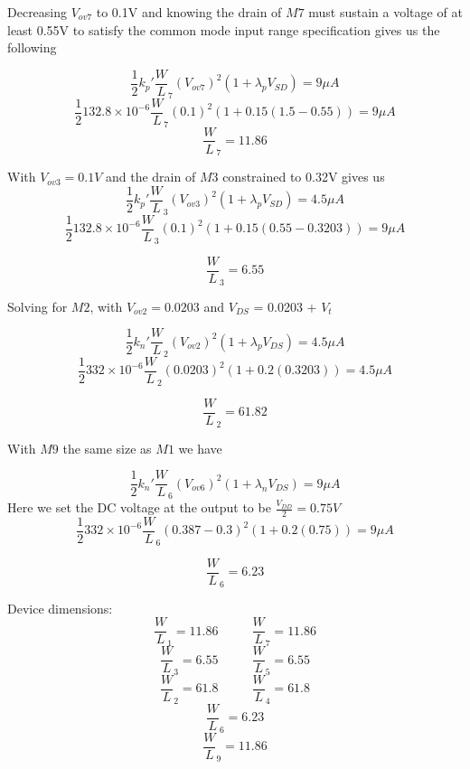 \documentclass[]{article}
\begin{document}
\begin{enumerate}
		Decreasing $V_{ov7}$ to 0.1V and knowing the drain of $M7$ must sustain a voltage of at least 0.55V to satisfy the common mode input range specification gives us the following

		$$ \frac{1}{2}k_{p}'\frac{W}{L}_{7}(V_{ov7})^2(1+\lambda_{p}V_{SD}) = 9\mu A $$
		$$ \frac{1}{2}132.8\times10^{-6}\frac{W}{L}_{7}(0.1)^2(1+0.15(1.5-0.55)) = 9\mu A $$
		$$ \frac{W}{L}_{7} = 11.86$$
		\newline

		With $V_{ov3} = 0.1V $ and the drain of $M3$ constrained to 0.32V gives us
		$$ \frac{1}{2}k_{p}'\frac{W}{L}_{3}(V_{ov3})^2(1+\lambda_{p}V_{SD}) = 4.5\mu A $$
		$$ \frac{1}{2}132.8\times10^{-6}\frac{W}{L}_{3}(0.1)^2(1+0.15(0.55-0.3203)) = 9\mu A $$

		$$ \frac{W}{L}_{3} = 6.55$$
		\newline

		Solving for $M2$, with $V_{ov2} = 0.0203 $ and $V_{DS}$ = 0.0203 + $V_{t}$

		$$ \frac{1}{2}k_{n}'\frac{W}{L}_{2}(V_{ov2})^2(1+\lambda_{p}V_{DS}) = 4.5\mu A $$
		$$ \frac{1}{2}332\times10^{-6}\frac{W}{L}_{2}(0.0203)^2(1+0.2(0.3203)) = 4.5\mu A $$

		$$ \frac{W}{L}_{2} = 61.82$$
		\newline

		With $M9$ the same size as $M1$ we have

		$$ \frac{1}{2}k_{n}'\frac{W}{L}_{6}(V_{ov6})^2(1+\lambda_{n}V_{DS}) = 9\mu A $$
		Here we set the DC voltage at the output to be $\frac{V_{DD}}{2} = 0.75V$
		$$ \frac{1}{2}332\times10^{-6}\frac{W}{L}_{6}(0.387-0.3)^2(1+0.2(0.75)) = 9\mu A $$

		$$ \frac{W}{L}_{6} = 6.23$$

		Device dimensions:
		$$ \frac{W}{L}_{1} = 11.86 \ \ \ \ \ \ \ \ \ \ \ \ \frac{W}{L}_{7} = 11.86$$
		$$ \frac{W}{L}_{3} = 6.55  \ \ \ \ \ \ \ \ \ \ \ \  \frac{W}{L}_{5} = 6.55$$
		$$ \frac{W}{L}_{2} = 61.8 \ \ \ \ \ \ \ \ \ \ \ \  \frac{W}{L}_{4} = 61.8$$
		$$\frac{W}{L}_{6} = 6.23$$
		$$\frac{W}{L}_{9} = 11.86$$






\end{enumerate}
\end{document}
